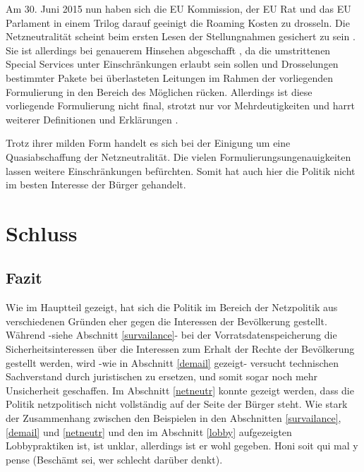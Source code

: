 \documentclass[
	12pt,
	a4paper,
	BCOR10mm,
	DIV14,
	listof=totoc,
	bibliography=totoc,
	headsepline
]{scrreprt}
\begin{document}
Am 30. Juni 2015 nun haben sich die EU Kommission, der EU Rat und das EU Parlament in einem Trilog darauf geeinigt die Roaming Kosten zu drosseln.
Die Netzneutralität scheint beim ersten Lesen der Stellungnahmen gesichert zu sein \cite{ecwelcomennn}.
Sie ist allerdings bei genauerem Hinsehen abgeschafft \cite{nepo:endnn}, da die umstrittenen Special Services unter Einschränkungen erlaubt sein sollen und Drosselungen bestimmter Pakete bei überlasteten Leitungen im Rahmen der vorliegenden Formulierung in den Bereich des Möglichen rücken.
Allerdings ist diese vorliegende Formulierung nicht final, strotzt nur vor Mehrdeutigkeiten und harrt weiterer Definitionen und Erklärungen \cite{nndealblurry}.

Trotz ihrer milden Form handelt es sich bei der Einigung um eine Quasiabschaffung der Netzneutralität.
Die vielen Formulierungsungenauigkeiten lassen weitere Einschränkungen befürchten.
Somit hat auch hier die Politik nicht im besten Interesse der Bürger gehandelt.



\chapter{Schluss}
\label{end}
\section{Fazit}
\label{conclusion}
Wie im Hauptteil gezeigt, hat sich die Politik im Bereich der Netzpolitik aus verschiedenen Gründen eher gegen die Interessen der Bevölkerung gestellt.
Während -siehe Abschnitt \ref{survailance}- bei der Vorratsdatenspeicherung die Sicherheitsinteressen über die Interessen zum Erhalt der Rechte der Bevölkerung gestellt werden, wird -wie in Abschnitt \ref{demail} gezeigt- versucht technischen Sachverstand durch juristischen zu ersetzen, und somit sogar noch mehr Unsicherheit geschaffen.
Im Abschnitt \ref{netneutr} konnte gezeigt werden, dass die Politik netzpolitisch nicht vollständig auf der Seite der Bürger steht.
Wie stark der Zusammenhang zwischen den Beispielen in den Abschnitten \ref{survailance}, \ref{demail} und \ref{netneutr} und den im Abschnitt \ref{lobby} aufgezeigten Lobbypraktiken ist, ist unklar, allerdings ist er wohl gegeben.
Honi soit qui mal y pense (Beschämt sei, wer schlecht darüber denkt).
\end{document}

